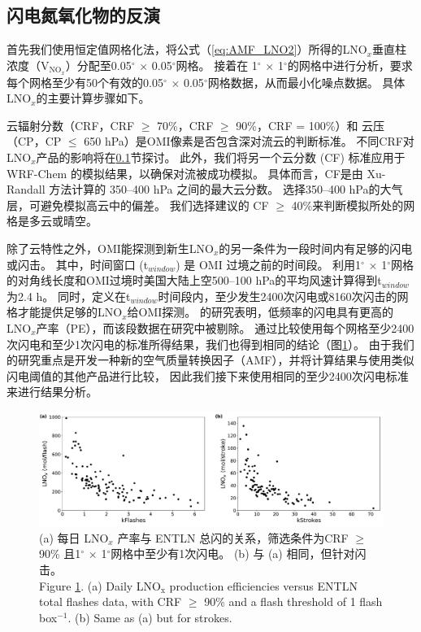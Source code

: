 \subsection{闪电氮氧化物的反演} \label{subsec:retrieval_polluted}

首先我们使用恒定值网格化法，将公式（\ref{eq:AMF_LNO2}）所得的LNO$_x$垂直柱浓度（V$_{\textrm{NO$_x$}}$）分配至0.05$^{\circ}$ $\times$ 0.05$^{\circ}$网格\citep{Kuhlmann.2014}。
接着在 1$^{\circ}$ $\times$ 1$^{\circ}$的网格中进行分析，要求每个网格至少有50个有效的0.05$^{\circ}$ $\times$ 0.05$^{\circ}$网格数据，从而最小化噪点数据。
具体LNO$_x$的主要计算步骤如下。

云辐射分数（CRF，CRF $\geq$ 70\%，CRF $\geq$ 90\%，CRF = 100\%）和 云压（CP，CP $\leq$ 650 hPa）是OMI像素是否包含深对流云的判断标准\citep{Ziemke.2009,Choi.2014,Pickering.2016}。
不同CRF对LNO$_x$产品的影响将在\ref{subsec:retrieval_polluted}节探讨。
此外，我们将另一个云分数 (CF) 标准应用于 WRF-Chem 的模拟结果，以确保对流被成功模拟。
具体而言，CF是由 Xu-Randall 方法计算的 350--400 hPa 之间的最大云分数\citep{Xu.1996,Strode.2017}。
选择350--400 hPa的大气层，可避免模拟高云中的偏差。
我们选择\citet{Strode.2017}建议的 CF $\geq$ 40\%来判断模拟所处的网格是多云或晴空。

除了云特性之外，OMI能探测到新生LNO$_x$的另一条件为一段时间内有足够的闪电或闪击。
其中，时间窗口 (t$_{window}$) 是 OMI 过境之前的时间段。
\citet{Lapierre.2020}利用1$^{\circ}$ $\times$ 1$^{\circ}$网格的对角线长度和OMI过境时美国大陆上空500--100 hPa的平均风速计算得到t$_{window}$为2.4 h。
同时，\citet{Lapierre.2020}定义在t$_{window}$时间段内，至少发生2400次闪电或8160次闪击的网格才能提供足够的LNO$_x$给OMI探测。
\citet{Bucsela.2019}的研究表明，低频率的闪电具有更高的LNO$_x$产率（PE），而该段数据在\citet{Lapierre.2020}研究中被剔除。
通过比较使用每个网格至少2400次闪电和至少1次闪电的标准所得结果，我们也得到相同的结论（图\ref{fig:us_flash_threshold}）。
由于我们的研究重点是开发一种新的空气质量转换因子（AMF），并将计算结果与使用类似闪电阈值的其他产品进行比较\citep{Pickering.2016,Lapierre.2020}，
因此我们接下来使用相同的至少2400次闪电标准来进行结果分析。


\begin{figure}[!htbp]
    \includegraphics[width=15cm]{./figures/us_flash_threshold.pdf}
    \caption{
    (a) 每日 LNO$_x$ 产率与 ENTLN 总闪的关系，筛选条件为CRF $\geq$ 90\% 且1$^{\circ}$ $\times$ 1$^{\circ}$网格中至少有1次闪电。
     (b) 与 (a) 相同，但针对闪击。\\
    Figure \ref{fig:us_flash_threshold}. (a) Daily LNO$_\textrm{x}$ production efficiencies versus ENTLN total flashes data, with CRF $\geq$ 90\% and a flash threshold of 1 flash box$^{-1}$.
    (b) Same as (a) but for strokes.}
    \label{fig:us_flash_threshold}
\end{figure}


